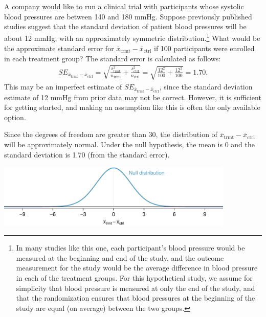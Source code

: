 \begin{example}{A company would like to run a clinical trial with participants whose systolic blood pressures are between 140 and 180 mmHg. Suppose previously published studies suggest that the standard deviation of patient blood pressures will be about 12 mmHg, with an approximately symmetric distribution.\footnote{In many studies like this one, each participant's blood pressure would be measured at the beginning and end of the study, and the outcome measurement for the study would be the average difference in blood pressure in each of the treatment groups. For this hypothetical study, we assume for simplicity that blood pressure is measured at only the end of the study, and that the randomization ensures that blood pressures at the beginning of the study are equal (on average) between the two groups.} What would be the approximate standard error for $\overline{x}_{ \text{trmt}} - \overline{x}_{ \text{ctrl}}$ if 100 participants were enrolled in each treatment group?}
The standard error is calculated as follows:
\begin{align*}
SE_{\overline{x}_{ \text{trmt}} - \overline{x}_{ \text{ctrl}}}
  = \sqrt{\frac{s_{ \text{trmt}}^2}{n_{ \text{trmt}}} + \frac{s_{ \text{ctrl}}^2}{n_{ \text{ctrl}}}}
  = \sqrt{\frac{12^2}{100} + \frac{12^2}{100}}
  = 1.70.
\end{align*}
This may be an imperfect estimate of $SE_{\overline{x}_{ \text{trmt}} - \overline{x}_{\text{ctrl}}}$, since the standard deviation estimate of 12 mmHg from prior data may not be correct. However, it is sufficient for getting started, and making an assumption like this is often the only available option. 
\end{example}

Since the degrees of freedom are greater than 30, the distribution of $\overline{x}_{ \text{trmt}} - \overline{x}_{ \text{ctrl}}$ will be approximately normal. Under the null hypothesis, the mean is 0 and the standard deviation is 1.70 (from the standard error).

\begin{center}
	\includegraphics[width=0.85\textwidth]{ch_inference_for_means_oi_biostat/figures/power_null_0_1-7/power_null_A_0_1-7}
\end{center}


